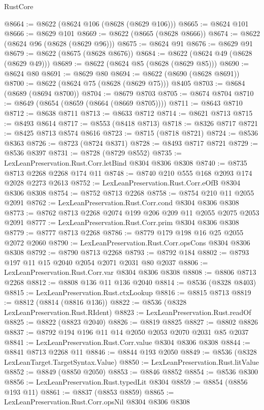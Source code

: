 \begin{lexlean}{RustCore}
\begin{coremodule}
@8664 := @8622 (@8624 @106 (@8628 (@8629 @106)))
@8665 := @8624 @101
@8666 := @8629 @101
@8669 := @8622 (@8665 (@8628 @8666))
@8674 := @8622 (@8624 @96 (@8628 (@8629 @96)))
@8675 := @8624 @91
@8676 := @8629 @91
@8679 := @8622 (@8675 (@8628 @8676))
@8684 := @8622 (@8624 @49 (@8628 (@8629 @49)))
@8689 := @8622 (@8624 @85 (@8628 (@8629 @85)))
@8690 := @8624 @80
@8691 := @8629 @80
@8694 := @8622 (@8690 (@8628 @8691))
@8700 := @8622 (@8624 @75 (@8628 (@8629 @75))) @8405
@8703 := @8684 (@8689 (@8694 @8700))
@8704 := @8679 @8703
@8705 := @8674 @8704
@8710 := @8649 (@8654 (@8659 (@8664 (@8669 @8705))))
@8711 := @8643 @8710
@8712 := @8638 @8711
@8713 := @8633 @8712
@8714 := @8621 @8713
@8715 := @8493 @8614
@8717 := @8553 (@8418 @8713)
@8718 := @8326 @8717
@8721 := @8425 @8713 @8574 @8616
@8723 := @8715 (@8718 @8721)
@8724 := @8536 @8363
@8726 := @8723 (@8724 @8371)
@8728 := @8493 @8717 @8721
@8729 := @8536 @8397
@8731 := @8728 (@8729 @8552)
@8735 := LexLeanPreservation.Rust.Corr.letBind @8304 @8306 @8308
@8740 := @8735 @8713 @2268 @2268 @174 @11
@8748 := @8740 @210 @555 @168 @2093 @174 @2028 @2273 @2613
@8752 := LexLeanPreservation.Rust.Corr.eOfB @8304 @8306 @8308
@8754 := @8752 @8713 @2268
@8758 := @8754 @210 @11 @2055 @2091
@8762 := LexLeanPreservation.Rust.Corr.cond @8304 @8306 @8308
@8773 := @8762 @8713 @2268 @2074 @199 @206 @209 @11 @2055 @2075 @2053 @2091
@8777 := LexLeanPreservation.Rust.Corr.prim @8304 @8306 @8308
@8779 := @8777 @8713 @2268
@8786 := @8779 @179 @198 @16 @25 @2055 @2072 @2060
@8790 := LexLeanPreservation.Rust.Corr.opsCons @8304 @8306 @8308
@8792 := @8790 @8713 @2268
@8793 := @8792 @184
@8802 := @8793 @197 @11 @15 @2040 @2054 @2071 @2031 @80 @2037
@8806 := LexLeanPreservation.Rust.Corr.var @8304 @8306 @8308
@8808 := @8806 @8713 @2268
@8812 := @8808 @136 @11 @136 @2040
@8814 := @8536 (@8328 @8403)
@8815 := LexLeanPreservation.Rust.ctxLookup
@8816 := @8815 @8713
@8819 := @8812 (@8814 (@8816 @136))
@8822 := @8536 (@8328 LexLeanPreservation.Rust.RIdent)
@8823 := LexLeanPreservation.Rust.readOf
@8825 := @8822 (@8823 @2040)
@8826 := @8819 @8825
@8827 := @8802 @8826
@8837 := @8792 @194 @196 @11 @14 @2050 @2053 @2070 @2031 @85 @2037
@8841 := LexLeanPreservation.Rust.Corr.value @8304 @8306 @8308
@8844 := @8841 @8713 @2268 @11
@8846 := @8844 @193 @2050
@8849 := @8536 (@8328 LexLeanTarget.TargetSyntax.Value)
@8850 := LexLeanPreservation.Rust.litValue
@8852 := @8849 (@8850 @2050)
@8853 := @8846 @8852
@8854 := @8536 @8300
@8856 := LexLeanPreservation.Rust.typedLit @8304
@8859 := @8854 (@8856 @193 @11)
@8861 := @8837 (@8853 @8859)
@8865 := LexLeanPreservation.Rust.Corr.opsNil @8304 @8306 @8308

\end{coremodule}
\end{lexlean}
